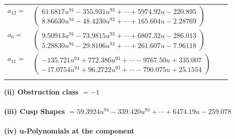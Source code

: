 \documentclass[1p]{elsarticle_modified}
\theoremstyle{definition}
\begin{document}
\begin{tabular}{m{7pt} m{180pt} m{7pt} m{180pt} }
\flushright $a_{12}=$&$\begin{pmatrix}61.6817 u^{94}-355.931 u^{93}+\cdots+5974.92 u-220.895\\8.86630 u^{94}-48.4230 u^{93}+\cdots+165.604 u-2.28769\end{pmatrix}$ \\
\flushright $a_{6}=$&$\begin{pmatrix}9.50913 u^{94}-73.9815 u^{93}+\cdots+6807.32 u-286.013\\5.28830 u^{94}-29.8106 u^{93}+\cdots+261.607 u-7.96118\end{pmatrix}$ \\
\flushright $a_{11}=$&$\begin{pmatrix}-135.721 u^{94}+772.386 u^{93}+\cdots-9767.50 u+335.007\\-17.0754 u^{94}+96.2722 u^{93}+\cdots-790.075 u+25.1554\end{pmatrix}$\\&\end{tabular}
\flushleft \textbf{(ii) Obstruction class $= -1$}\\~\\
\flushleft \textbf{(iii) Cusp Shapes $= 59.3924 u^{94}-339.420 u^{93}+\cdots+6474.19 u-259.078$}\\~\\
\newpage\renewcommand{\arraystretch}{1}
\flushleft \textbf{(iv) u-Polynomials at the component}\newline \\
\end{document}
